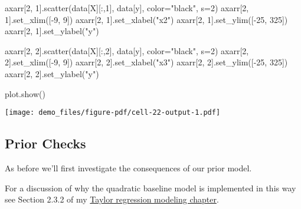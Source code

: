 \documentclass[
  letterpaper,
  DIV=11,
  numbers=noendperiod]{scrartcl}
\newenvironment{Shaded}{\begin{snugshade}}{\end{snugshade}}
\newcommand{\DecValTok}[1]{\textcolor[rgb]{0.68,0.00,0.00}{#1}}
\newcommand{\NormalTok}[1]{\textcolor[rgb]{0.00,0.23,0.31}{#1}}
\newcommand{\OperatorTok}[1]{\textcolor[rgb]{0.37,0.37,0.37}{#1}}
\newcommand{\StringTok}[1]{\textcolor[rgb]{0.13,0.47,0.30}{#1}}
\begin{document}
\begin{Shaded}
\begin{Highlighting}[]
\NormalTok{axarr[}\DecValTok{2}\NormalTok{, }\DecValTok{1}\NormalTok{].scatter(data[}\StringTok{\textquotesingle{}X\textquotesingle{}}\NormalTok{][:,}\DecValTok{1}\NormalTok{], data[}\StringTok{\textquotesingle{}y\textquotesingle{}}\NormalTok{], color}\OperatorTok{=}\StringTok{"black"}\NormalTok{, s}\OperatorTok{=}\DecValTok{2}\NormalTok{)}
\NormalTok{axarr[}\DecValTok{2}\NormalTok{, }\DecValTok{1}\NormalTok{].set\_xlim([}\OperatorTok{{-}}\DecValTok{9}\NormalTok{, }\DecValTok{9}\NormalTok{])}
\NormalTok{axarr[}\DecValTok{2}\NormalTok{, }\DecValTok{1}\NormalTok{].set\_xlabel(}\StringTok{"x2"}\NormalTok{)}
\NormalTok{axarr[}\DecValTok{2}\NormalTok{, }\DecValTok{1}\NormalTok{].set\_ylim([}\OperatorTok{{-}}\DecValTok{25}\NormalTok{, }\DecValTok{325}\NormalTok{])}
\NormalTok{axarr[}\DecValTok{2}\NormalTok{, }\DecValTok{1}\NormalTok{].set\_ylabel(}\StringTok{"y"}\NormalTok{)}

\NormalTok{axarr[}\DecValTok{2}\NormalTok{, }\DecValTok{2}\NormalTok{].scatter(data[}\StringTok{\textquotesingle{}X\textquotesingle{}}\NormalTok{][:,}\DecValTok{2}\NormalTok{], data[}\StringTok{\textquotesingle{}y\textquotesingle{}}\NormalTok{], color}\OperatorTok{=}\StringTok{"black"}\NormalTok{, s}\OperatorTok{=}\DecValTok{2}\NormalTok{)}
\NormalTok{axarr[}\DecValTok{2}\NormalTok{, }\DecValTok{2}\NormalTok{].set\_xlim([}\OperatorTok{{-}}\DecValTok{9}\NormalTok{, }\DecValTok{9}\NormalTok{])}
\NormalTok{axarr[}\DecValTok{2}\NormalTok{, }\DecValTok{2}\NormalTok{].set\_xlabel(}\StringTok{"x3"}\NormalTok{)}
\NormalTok{axarr[}\DecValTok{2}\NormalTok{, }\DecValTok{2}\NormalTok{].set\_ylim([}\OperatorTok{{-}}\DecValTok{25}\NormalTok{, }\DecValTok{325}\NormalTok{])}
\NormalTok{axarr[}\DecValTok{2}\NormalTok{, }\DecValTok{2}\NormalTok{].set\_ylabel(}\StringTok{"y"}\NormalTok{)}

\NormalTok{plot.show()}
\end{Highlighting}
\end{Shaded}

\texttt{[image: demo\_files/figure-pdf/cell-22-output-1.pdf]}

\subsection{Prior Checks}\label{prior-checks-1}

As before we'll first investigate the consequences of our prior model.

For a discussion of why the quadratic baseline model is implemented in
this way see Section 2.3.2 of my
\href{https://betanalpha.github.io/assets/case_studies/taylor_models.html\#232_Higher-Order_Implementations}{Taylor
regression modeling chapter}.
\end{document}
